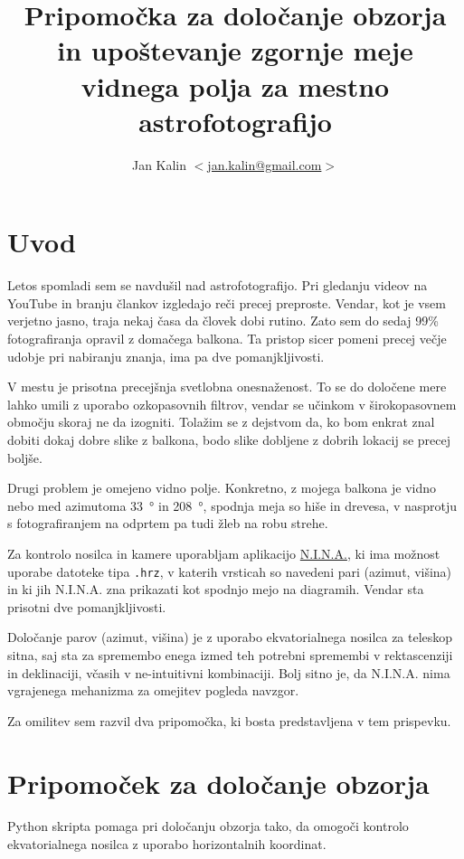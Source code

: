 \documentclass[11pt]{article}
\title{Pripomočka za določanje obzorja in upoštevanje zgornje meje vidnega polja za mestno astrofotografijo}
\author{Jan Kalin $<$\href{mailto:jan.kalin@gmail.com}{jan.kalin@gmail.com}$>$}
\makeatletter
\newcommand{\nina}{N.I.N.A.\@\xspace}
\makeatother
\begin{document}
\maketitle

\section{Uvod}

Letos spomladi sem se navdušil nad astrofotografijo. Pri gledanju videov na YouTube in branju člankov izgledajo reči precej preproste. Vendar, kot je vsem verjetno jasno, traja nekaj časa da človek dobi rutino. Zato sem do sedaj 99\% fotografiranja opravil z domačega balkona. Ta pristop sicer pomeni precej večje udobje pri nabiranju znanja, ima pa dve pomanjkljivosti.

V mestu je prisotna precejšnja svetlobna onesnaženost. To se do določene mere lahko umili z uporabo ozkopasovnih filtrov, vendar se učinkom v ši\-ro\-ko\-pa\-sov\-nem območju skoraj ne da izogniti. Tolažim se z dejstvom da, ko bom enkrat znal dobiti dokaj dobre slike z balkona, bodo slike dobljene z dobrih lokacij se precej boljše.

Drugi problem je omejeno vidno polje. Konkretno, z mojega balkona je vidno nebo med azimutoma \SI{33}{\degree} in \SI{208}{\degree}, spodnja meja so hiše in drevesa, v nasprotju s fotografiranjem na odprtem pa tudi žleb na robu strehe.

Za kontrolo nosilca in kamere uporabljam aplikacijo \href{https://nighttime-imaging.eu/}{\nina}, ki ima možnost uporabe datoteke tipa \texttt{.hrz}, v katerih vrsticah so navedeni pari (azimut, višina) in ki jih \nina zna prikazati kot spodnjo mejo na diagramih. Vendar sta prisotni dve pomanjkljivosti.

Določanje parov (azimut, višina) je z uporabo ekvatorialnega nosilca za teleskop sitna, saj sta za spremembo enega izmed teh potrebni spremembi v rektascenziji in deklinaciji, včasih v ne-intuitivni kombinaciji. Bolj sitno je, da \nina nima vgrajenega mehanizma za omejitev pogleda navzgor.

Za omilitev sem razvil dva pripomočka, ki bosta predstavljena v tem prispevku.

\section{Pripomoček za določanje obzorja}

Python skripta  pomaga pri določanju obzorja tako, da omogoči kontrolo ekvatorialnega nosilca z uporabo horizontalnih koordinat.
\end{document}

